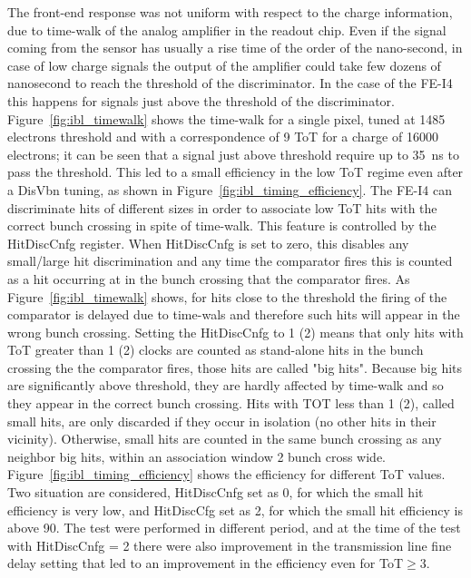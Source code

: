 The front-end response was not uniform with respect to the charge information, due to time-walk of the analog amplifier in the readout chip. Even if the signal coming from the sensor has usually a rise time of the order of the nano-second, in case of low charge signals the output of the amplifier could take few dozens of nanosecond to reach the threshold of the discriminator. In the case of the FE-I4 this happens for signals just above the threshold of the discriminator. Figure~\ref{fig:ibl_timewalk} shows the time-walk for a single pixel, tuned at 1485 electrons threshold and with a correspondence of 9 ToT for a charge of 16000 electrons; it can be seen that a signal just above threshold require up to \SI{35}{\nano\second} to pass the threshold. This led to a small efficiency in the low ToT regime even after a DisVbn tuning, as shown in Figure~\ref{fig:ibl_timing_efficiency}.
The FE-I4 can discriminate hits of different sizes in order to associate low ToT hits with the correct bunch crossing in spite of time-walk. This feature is controlled by the HitDiscCnfg register. When HitDiscCnfg is set to zero, this disables any small/large hit discrimination and any time the comparator fires this is counted as a hit occurring at in the bunch crossing that the comparator fires. As Figure~\ref{fig:ibl_timewalk} shows, for hits close to the threshold the firing of the comparator is delayed due to time-wals and therefore such hits will appear in the wrong bunch crossing. Setting the HitDiscCnfg to 1 (2) means that only hits with ToT greater than 1 (2) clocks are counted as stand-alone hits in the bunch crossing the the comparator fires, those hits are called "big hits". Because big hits are significantly above threshold, they are hardly affected by time-walk and so they appear in the correct bunch crossing. Hits with TOT less than 1 (2), called small hits, are only discarded if they occur in isolation (no other hits in their vicinity). Otherwise, small hits are counted in the same bunch crossing as any neighbor big hits, within an association window 2 bunch cross wide.
Figure~\ref{fig:ibl_timing_efficiency} shows the efficiency for different ToT values. Two situation are considered, HitDiscCnfg set as 0, for which the small hit efficiency is very low, and HitDiscCfg set as 2, for which the small hit efficiency is above 90\percent. The test were performed in different period, and at the time of the test with HitDiscCnfg = 2 there were also improvement in the transmission line fine delay setting that led to an improvement in the efficiency even for ToT$ \ge 3$.

